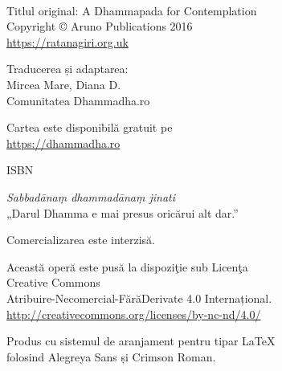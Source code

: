 \cleartoverso
\thispagestyle{empty}

{\copyrightsize
\centering
\setlength{\parindent}{0pt}%
\setlength{\parskip}{0.8\baselineskip}%

\thetitle\\
\theauthor

Titlul original: A Dhammapada for Contemplation\\
Copyright © Aruno Publications 2016\\
\href{https://ratanagiri.org.uk}{https://ratanagiri.org.uk}

Traducerea și adaptarea:\\
Mircea Mare, Diana D.\\
Comunitatea Dhammadha.ro

Cartea este disponibilă gratuit pe\\
\href{https://dhammadha.ro}{https://dhammadha.ro}

ISBN \theISBN

\theEditionInfo

\vfill

\emph{Sabbadānaṃ dhammadānaṃ jinati}\\
„Darul Dhamma e mai presus oricărui alt dar.”

Comercializarea este interzisă.

Această operă este pusă la dispoziţie sub Licenţa\\
Creative Commons\\
Atribuire-Necomercial-FărăDerivate 4.0 Internațional.\\
\href{http://creativecommons.org/licenses/by-nc-nd/4.0/}{http://creativecommons.org/licenses/by-nc-nd/4.0/}

Produs cu sistemul de aranjament pentru tipar \LaTeX\,\\
folosind Alegreya Sans și Crimson Roman.

}
